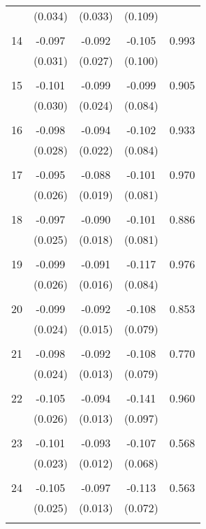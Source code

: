 \begin{tabular}{l*{1}{cccc}}
          & (0.034) & (0.033) & (0.109) & \\
 & & & &\\
  14       & -0.097 & -0.092 & -0.105 & 0.993 \\
          & (0.031) & (0.027) & (0.100) & \\
 & & & &\\
  15       & -0.101 & -0.099 & -0.099 & 0.905 \\
          & (0.030) & (0.024) & (0.084) & \\
 & & & &\\
  16       & -0.098 & -0.094 & -0.102 & 0.933 \\
          & (0.028) & (0.022) & (0.084) & \\
 & & & &\\
  17       & -0.095 & -0.088 & -0.101 & 0.970 \\
          & (0.026) & (0.019) & (0.081) & \\
 & & & &\\
  18       & -0.097 & -0.090 & -0.101 & 0.886 \\
          & (0.025) & (0.018) & (0.081) & \\
 & & & &\\
  19       & -0.099 & -0.091 & -0.117 & 0.976 \\
          & (0.026) & (0.016) & (0.084) & \\
 & & & &\\
  20       & -0.099 & -0.092 & -0.108 & 0.853 \\
          & (0.024) & (0.015) & (0.079) & \\
 & & & &\\
  21       & -0.098 & -0.092 & -0.108 & 0.770 \\
          & (0.024) & (0.013) & (0.079) & \\
 & & & &\\
  22       & -0.105 & -0.094 & -0.141 & 0.960 \\
          & (0.026) & (0.013) & (0.097) & \\
 & & & &\\
  23       & -0.101 & -0.093 & -0.107 & 0.568 \\
          & (0.023) & (0.012) & (0.068) & \\
 & & & &\\
  24       & -0.105 & -0.097 & -0.113 & 0.563 \\
          & (0.025) & (0.013) & (0.072) & \\
 & & & &\\

\end{tabular}
